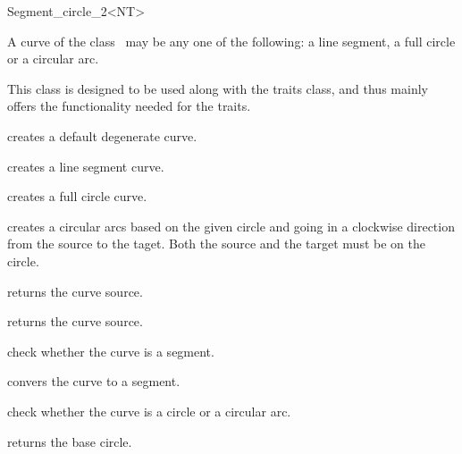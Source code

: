 
\ccRefPageBegin

\begin{ccRefClass}{Segment_circle_2<NT>} 
    
\ccDefinition A curve  of the class
    \ccClassTemplateName\ may be any one of the following: a line segment,
    a full circle or a circular arc.

    This class is designed to be used along with the
     traits class, and thus mainly
    offers the functionality needed for the traits.  

    
\ccCreation

	{creates a default degenerate curve.}

	{creates a line segment curve.}

	{creates a full circle curve.}

	{creates a circular arcs based on the given circle and going in a clockwise direction from the source to the taget. Both the source and the target must be on the circle.}


\ccOperations
    
	{returns the curve source.}

	{returns the curve source.}

	{check whether the curve is a segment.}

	{convers the curve to a segment.
       	}

	{check whether the curve is a circle or a circular arc.}
    
	{returns the base circle.
       	}

\end{ccRefClass}


\ccRefPageEnd

